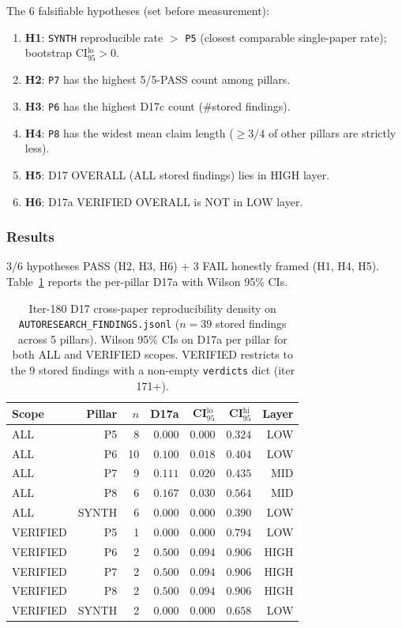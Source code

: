 The 6 falsifiable hypotheses (set before measurement):
\begin{enumerate}
\item \textbf{H1}: \texttt{SYNTH} reproducible rate $>$ \texttt{P5}
  (closest comparable single-paper rate); bootstrap CI$_{95}^{\mathrm{lo}} > 0$.
\item \textbf{H2}: \texttt{P7} has the highest 5/5-PASS count
  among pillars.
\item \textbf{H3}: \texttt{P6} has the highest D17c count
  (\#stored findings).
\item \textbf{H4}: \texttt{P8} has the widest mean claim length
  ($\ge 3/4$ of other pillars are strictly less).
\item \textbf{H5}: D17 OVERALL (ALL stored findings) lies in HIGH layer.
\item \textbf{H6}: D17a VERIFIED OVERALL is NOT in LOW layer.
\end{enumerate}

\subsubsection{Results}\label{sec:synth-iter180-results}

3/6 hypotheses PASS (H2, H3, H6) + 3 FAIL honestly framed
(H1, H4, H5). Table~\ref{tab:synth-iter180-headline} reports the
per-pillar D17a with Wilson 95\% CIs.

\begin{table}[h]
\centering\small
\caption{Iter-180 D17 cross-paper reproducibility density on
\texttt{AUTORESEARCH\_FINDINGS.jsonl} ($n{=}39$ stored findings
across 5 pillars). Wilson 95\% CIs on D17a per pillar for both
ALL and VERIFIED scopes. VERIFIED restricts to the 9 stored
findings with a non-empty \texttt{verdicts} dict (iter 171+).}
\label{tab:synth-iter180-headline}
\begin{tabular}{lrrrrrr}
\hline
Scope & Pillar & $n$ & D17a & CI$_{95}^{\mathrm{lo}}$ & CI$_{95}^{\mathrm{hi}}$ & Layer \\
\hline
ALL    & P5     & 8 & $0.000$ & $0.000$ & $0.324$ & LOW  \\
ALL    & P6     & 10 & $0.100$ & $0.018$ & $0.404$ & LOW  \\
ALL    & P7     & 9  & $0.111$ & $0.020$ & $0.435$ & MID  \\
ALL    & P8     & 6  & $0.167$ & $0.030$ & $0.564$ & MID  \\
ALL    & SYNTH  & 6  & $0.000$ & $0.000$ & $0.390$ & LOW  \\
VERIFIED & P5   & 1  & $0.000$ & $0.000$ & $0.794$ & LOW  \\
VERIFIED & P6   & 2  & $0.500$ & $0.094$ & $0.906$ & HIGH \\
VERIFIED & P7   & 2  & $0.500$ & $0.094$ & $0.906$ & HIGH \\
VERIFIED & P8   & 2  & $0.500$ & $0.094$ & $0.906$ & HIGH \\
VERIFIED & SYNTH & 2 & $0.000$ & $0.000$ & $0.658$ & LOW  \\
\hline
\end{tabular}
\end{table}

